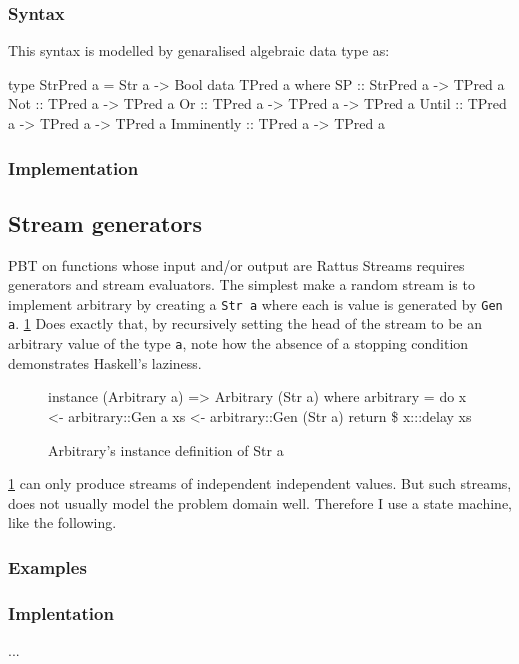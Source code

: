 

        
\subsubsection{Syntax}

This syntax is modelled by genaralised algebraic data type as:
\begin{hscode}
type StrPred a = Str a -> Bool
data TPred a where
    SP          :: StrPred a -> TPred a
    Not         :: TPred a -> TPred a
    Or          :: TPred a -> TPred a -> TPred a
    Until       :: TPred a -> TPred a -> TPred a
    Imminently  :: TPred a -> TPred a
\end{hscode}
\subsubsection{Implementation}


\subsection{Stream generators}
PBT on functions whose input and/or output are Rattus Streams requires generators and stream evaluators. The simplest make a random stream is to implement arbitrary  by creating a \verb|Str a| where each is value is generated by \verb|Gen a|.
\ref{lst:ArbStr} Does exactly that, by recursively setting the head of the stream to be an arbitrary value of the type \verb|a|, note how the absence of a stopping condition demonstrates Haskell's laziness. 
\begin{figure}
    \begin{hscode}
        instance (Arbitrary a) => Arbitrary (Str a) where
        arbitrary = do
            x <- arbitrary::Gen a
            xs <- arbitrary::Gen (Str a)
            return \$ x:::delay xs
    \end{hscode}
    \caption{Arbitrary's instance definition of Str a}
    \label{lst:ArbStr}
\end{figure}
\ref{lst:ArbStr} can only produce streams of independent independent values. But such streams, does not usually model the problem domain well. Therefore I use a state machine, like the following.
\subsubsection{Examples}
\subsubsection{Implentation}
...
